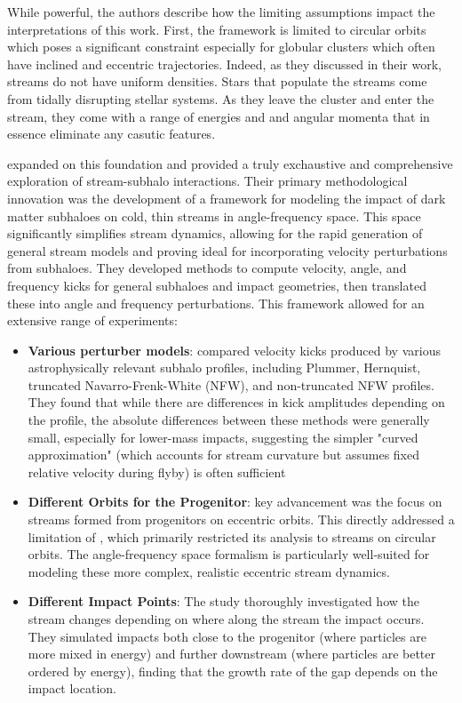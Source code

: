             While powerful, the authors describe how the limiting assumptions impact the interpretations of this work. First, the framework is limited to circular orbits which poses a significant constraint especially for globular clusters which often have inclined and eccentric trajectories. Indeed, as they discussed in their work, streams do not have uniform densities. Stars that populate the streams come from tidally disrupting stellar systems. As they leave the cluster and enter the stream, they come with a range of energies and and angular momenta that in essence eliminate any casutic features. 

            \citet{2016MNRAS.457.3817S} expanded on this foundation and provided a truly exchaustive and comprehensive exploration of stream-subhalo interactions. Their primary methodological innovation was the development of a framework for modeling the impact of dark matter subhaloes on cold, thin streams in angle-frequency space. This space significantly simplifies stream dynamics, allowing for the rapid generation of general stream models and proving ideal for incorporating velocity perturbations from subhaloes. They developed methods to compute velocity, angle, and frequency kicks for general subhaloes and impact geometries, then translated these into angle and frequency perturbations. This framework allowed for an extensive range of experiments:
            \begin{itemize}
                \item \textbf{Various perturber models}: \citet{2016MNRAS.457.3817S} compared velocity kicks produced by various astrophysically relevant subhalo profiles, including Plummer, Hernquist, truncated Navarro-Frenk-White (NFW), and non-truncated NFW profiles. They found that while there are differences in kick amplitudes depending on the profile, the absolute differences between these methods were generally small, especially for lower-mass impacts, suggesting the simpler "curved approximation" (which accounts for stream curvature but assumes fixed relative velocity during flyby) is often sufficient
                \item \textbf{Different Orbits for the Progenitor}: key advancement was the focus on streams formed from progenitors on eccentric orbits. This directly addressed a limitation of \citet{2015MNRAS.450.1136E}, which primarily restricted its analysis to streams on circular orbits. The angle-frequency space formalism is particularly well-suited for modeling these more complex, realistic eccentric stream dynamics.
                \item \textbf{Different Impact Points}: The study thoroughly investigated how the stream changes depending on where along the stream the impact occurs. They simulated impacts both close to the progenitor (where particles are more mixed in energy) and further downstream (where particles are better ordered by energy), finding that the growth rate of the gap depends on the impact location. 
            \end{itemize}
